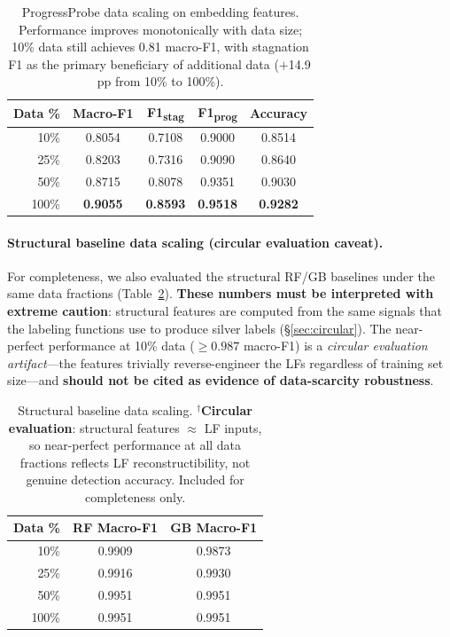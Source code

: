 \begin{table}[h]
\centering
\small
\begin{tabular}{rcccc}
\toprule
\textbf{Data \%} & \textbf{Macro-F1} & \textbf{F1\textsubscript{stag}} & \textbf{F1\textsubscript{prog}} & \textbf{Accuracy} \\
\midrule
10\% & 0.8054 & 0.7108 & 0.9000 & 0.8514 \\
25\% & 0.8203 & 0.7316 & 0.9090 & 0.8640 \\
50\% & 0.8715 & 0.8078 & 0.9351 & 0.9030 \\
100\% & \textbf{0.9055} & \textbf{0.8593} & \textbf{0.9518} & \textbf{0.9282} \\
\bottomrule
\end{tabular}
\caption{ProgressProbe data scaling on embedding features. Performance improves monotonically with data size; 10\% data still achieves 0.81 macro-F1, with stagnation F1 as the primary beneficiary of additional data ($+$14.9\,pp from 10\% to 100\%).}
\label{tab:data_scaling}
\end{table}

\paragraph{Structural baseline data scaling (circular evaluation caveat).}
For completeness, we also evaluated the structural RF/GB baselines under the same data fractions (Table~\ref{tab:structural_scaling}).
\textbf{These numbers must be interpreted with extreme caution}: structural features are computed from the same signals that the labeling functions use to produce silver labels (\S\ref{sec:circular}).
The near-perfect performance at 10\% data (${\geq}0.987$ macro-F1) is a \emph{circular evaluation artifact}---the features trivially reverse-engineer the LFs regardless of training set size---and \textbf{should not be cited as evidence of data-scarcity robustness}.

\begin{table}[h]
\centering
\small
\begin{tabular}{rcc}
\toprule
\textbf{Data \%} & \textbf{RF Macro-F1} & \textbf{GB Macro-F1} \\
\midrule
10\% & 0.9909 & 0.9873 \\
25\% & 0.9916 & 0.9930 \\
50\% & 0.9951 & 0.9951 \\
100\% & 0.9951 & 0.9951 \\
\bottomrule
\end{tabular}
\caption{Structural baseline data scaling. $^\dagger$\textbf{Circular evaluation}: structural features $\approx$ LF inputs, so near-perfect performance at all data fractions reflects LF reconstructibility, not genuine detection accuracy. Included for completeness only.}
\label{tab:structural_scaling}
\end{table}

